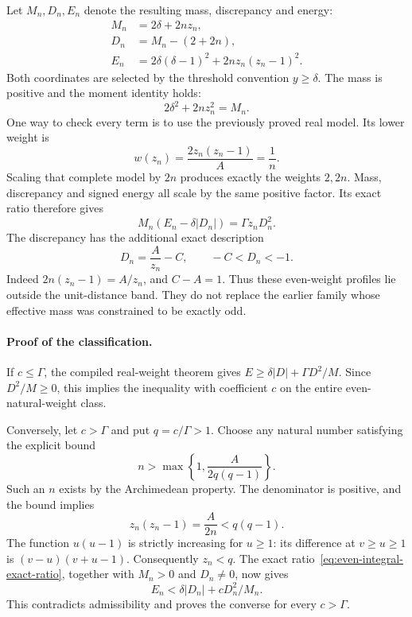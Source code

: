 Let \(M_n,D_n,E_n\) denote the resulting mass, discrepancy and energy:
\[
 \begin{split}
 M_n&=2\delta+2nz_n,\\
 D_n&=M_n-(2+2n),\\
 E_n&=2\delta(\delta-1)^2+2nz_n(z_n-1)^2.
 \end{split}
\]
Both coordinates are selected by the threshold convention
\(y\ge\delta\).  The mass is positive and the moment identity holds:
\[
 2\delta^2+2nz_n^2=M_n.
\]
One way to check every term is to use the previously proved real model.
Its lower weight is
\[
 w(z_n)=\frac{2z_n(z_n-1)}A=\frac1n.
\]
Scaling that complete model by \(2n\) produces exactly the weights
\(2,2n\).  Mass, discrepancy and signed energy all scale by the same
positive factor.  Its exact ratio therefore gives
\begin{equation}\label{eq:even-integral-exact-ratio}
 M_n(E_n-\delta|D_n|)=\Gamma z_nD_n^2.
\end{equation}
The discrepancy has the additional exact description
\begin{equation}\label{eq:even-integral-discrepancy}
 D_n=\frac A{z_n}-C,\qquad -C<D_n<-1.
\end{equation}
Indeed \(2n(z_n-1)=A/z_n\), and \(C-A=1\).
Thus these even-weight profiles lie outside the unit-distance band.
They do not replace the earlier family whose effective mass was
constrained to be exactly odd.

\paragraph{Proof of the classification.}
If \(c\le\Gamma\), the compiled real-weight theorem gives
\(E\ge\delta|D|+\Gamma D^2/M\).
Since \(D^2/M\ge0\), this implies the inequality with coefficient \(c\)
on the entire even-natural-weight class.

Conversely, let \(c>\Gamma\) and put \(q=c/\Gamma>1\).
Choose any natural number satisfying the explicit bound
\begin{equation}\label{eq:even-integral-witness}
 n>\max\left\{1,\frac A{2q(q-1)}\right\}.
\end{equation}
Such an \(n\) exists by the Archimedean property.
The denominator is positive, and the bound implies
\[
 z_n(z_n-1)=\frac A{2n}<q(q-1).
\]
The function \(u(u-1)\) is strictly increasing for \(u\ge1\):
its difference at \(v\ge u\ge1\) is
\((v-u)(v+u-1)\).
Consequently \(z_n<q\).
The exact ratio~\eqref{eq:even-integral-exact-ratio}, together with
\(M_n>0\) and \(D_n\ne0\), now gives
\[
 E_n<\delta|D_n|+cD_n^2/M_n.
\]
This contradicts admissibility and proves the converse for every
\(c>\Gamma\).

